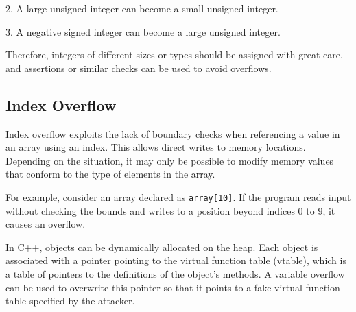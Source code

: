 2. A large unsigned integer can become a small unsigned integer.

3. A negative signed integer can become a large unsigned integer.

Therefore, integers of different sizes or types should be assigned with great care, and assertions or similar checks can be used to avoid overflows.

\subsection{Index Overflow}

Index overflow exploits the lack of boundary checks when referencing a value in an array using an index. This allows direct writes to memory locations. Depending on the situation, it may only be possible to modify memory values that conform to the type of elements in the array.

For example, consider an array declared as \texttt{array[10]}. If the program reads input without checking the bounds and writes to a position beyond indices \(0\) to \(9\), it causes an overflow.

\begin{remark}
  In C++, objects can be dynamically allocated on the heap. Each object is associated with a pointer pointing to the virtual function table (vtable), which is a table of pointers to the definitions of the object's methods. A variable overflow can be used to overwrite this pointer so that it points to a fake virtual function table specified by the attacker.
\end{remark}